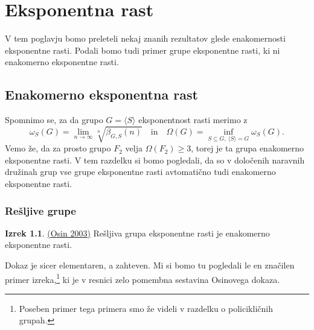 \documentclass[11pt]{book}
\theoremstyle{definition}
\theoremstyle{zgled}
\theoremstyle{odprtproblem}
\theoremstyle{domacanaloga}
\theoremstyle{izrek}
\newtheorem*{izrek}{Izrek}
\begin{document}
\chapter{Eksponentna rast}


V tem poglavju bomo preleteli nekaj znanih rezultatov glede enakomernosti eksponentne rasti. Podali bomo tudi primer grupe eksponentne rasti, ki ni enakomerno eksponentne rasti.

\section{Enakomerno eksponentna rast}

Spomnimo se, za da grupo $G = \langle S \rangle$ eksponentnost rasti merimo z
\[
\omega_S(G) = \lim_{n \to \infty} \sqrt[n]{\beta_{G,S}(n)}
\quad
\text{in}
\quad
\Omega(G) = \inf_{S \subseteq G, \ \langle S \rangle = G} \omega_S(G).
\]
Vemo že, da za prosto grupo $F_2$ velja $\Omega(F_2) \geq 3$, torej je ta grupa enakomerno eksponentne rasti. V tem razdelku si bomo pogledali, da so v določenih naravnih družinah grup vse grupe eksponentne rasti avtomatično tudi enakomerno eksponentne rasti.

\subsection{Rešljive grupe}

\begin{izrek}\href{https://citeseerx.ist.psu.edu/viewdoc/download?doi=10.1.1.520.8970&rep=rep1&type=pdf}{(Osin 2003)}
Rešljiva grupa eksponentne rasti je enakomerno eksponentne rasti.
\end{izrek}

Dokaz je sicer elementaren, a zahteven. Mi si bomo tu pogledali le en značilen primer izreka,\footnote{Poseben primer tega primera smo že videli v razdelku o policikličnih grupah.} ki je v resnici zelo pomembna sestavina Osinovega dokaza. 
\end{document}
